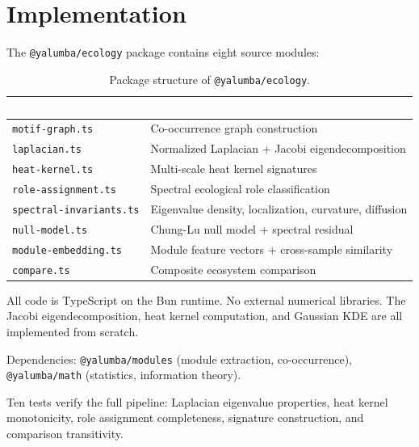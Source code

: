 \documentclass{../yalumba}
\begin{document}
\section{Implementation}
\label{sec:implementation}

The \texttt{@yalumba/ecology} package contains eight source modules:

\begin{table}[H]
  \centering
  \tablestyle
  \caption{Package structure of \texttt{@yalumba/ecology}.}
  \label{tab:package}
  \begin{tabular}{ll}
    \toprule
    \rowcolor{table-header}
    \textcolor{white}{\textbf{Module}} &
    \textcolor{white}{\textbf{Responsibility}} \\
    \midrule
    \texttt{motif-graph.ts} & Co-occurrence graph construction \\
    \texttt{laplacian.ts} & Normalized Laplacian + Jacobi eigendecomposition \\
    \texttt{heat-kernel.ts} & Multi-scale heat kernel signatures \\
    \texttt{role-assignment.ts} & Spectral ecological role classification \\
    \texttt{spectral-invariants.ts} & Eigenvalue density, localization, curvature, diffusion \\
    \texttt{null-model.ts} & Chung-Lu null model + spectral residual \\
    \texttt{module-embedding.ts} & Module feature vectors + cross-sample similarity \\
    \texttt{compare.ts} & Composite ecosystem comparison \\
    \bottomrule
  \end{tabular}
\end{table}

All code is TypeScript on the Bun runtime.  No external numerical libraries.
The Jacobi eigendecomposition, heat kernel computation, and Gaussian KDE are
all implemented from scratch.

Dependencies: \texttt{@yalumba/modules} (module extraction, co-occurrence),
\texttt{@yalumba/math} (statistics, information theory).

Ten tests verify the full pipeline: Laplacian eigenvalue properties, heat
kernel monotonicity, role assignment completeness, signature construction,
and comparison transitivity.


\end{document}

